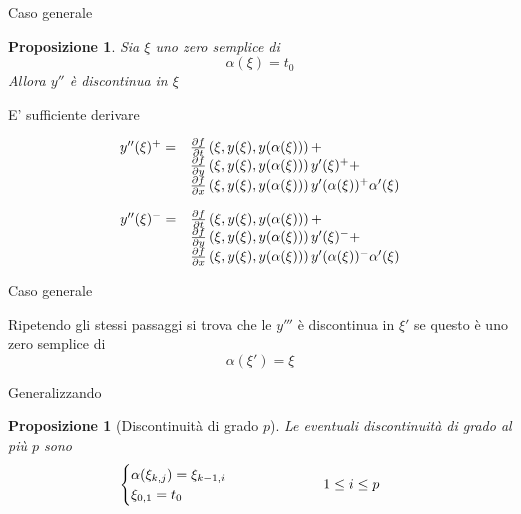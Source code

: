 \documentclass[intlimits]{beamer}
\numberwithin{equation}{section}
\theoremstyle{plain}
\newtheorem{prop}[teor]{Proposizione}
\theoremstyle{definition}
\theoremstyle{remark}
\begin{document}
\begin{frame}{Caso generale}

\begin{prop}
Sia $\xi$ uno zero semplice di
$$
\alpha(\xi)=t_0
$$
Allora $y''$ è discontinua in $\xi$
\end{prop}

\pause

E' sufficiente derivare
\small{
$$
\begin{array}{l l}
y''(\xi)^+ = 	&	\frac{\partial f}{\partial t} \left( \xi,y(\xi),y(\alpha(\xi)) \right) + 					\\
		&	\frac{\partial f}{\partial y} \left( \xi,y(\xi),y(\alpha(\xi)) \right) y'(\xi)^+ +				\\
		&	\frac{\partial f}{\partial x} \left( \xi,y(\xi),y(\alpha(\xi)) \right) y'(\alpha(\xi))^+ \alpha'(\xi)		\\
\end{array}
$$

$$
\begin{array}{l l}
y''(\xi)^- = 	&	\frac{\partial f}{\partial t} \left( \xi,y(\xi),y(\alpha(\xi)) \right) + 					\\
		&	\frac{\partial f}{\partial y} \left( \xi,y(\xi),y(\alpha(\xi)) \right) y'(\xi)^- +				\\
		&	\frac{\partial f}{\partial x} \left( \xi,y(\xi),y(\alpha(\xi)) \right) y'(\alpha(\xi))^- \alpha'(\xi)		\\
\end{array}
$$
}


\end{frame}


\begin{frame}{Caso generale}

\begin{block}{}
Ripetendo gli stessi passaggi si trova che le $y'''$ è discontinua in $\xi'$ se questo è uno zero semplice di
$$
\alpha(\xi') = \xi
$$
\end{block}

\pause

Generalizzando

\begin{prop}[Discontinuità di grado $p$]
Le eventuali discontinuità di grado al più $p$ sono
$$
\begin{cases}
\alpha (\xi_{k,j}) = \xi_{k-1,i}\\
\xi_{0,1}=t_0
\end{cases}
\hspace{2cm}
1 \le i \le p	\hspace{0.5cm}
$$
\end{prop}

\end{frame}
\end{document}
